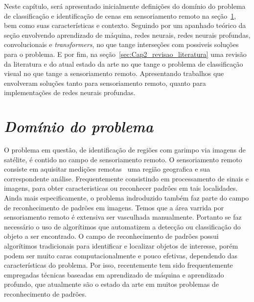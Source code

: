 Neste capítulo, será apresentado inicialmente definições do domínio do problema de classificação e identificação de cenas em sensoriamento remoto na seção~\ref{sec:Cap2_dominio}, bem como suas características e contexto. Seguindo por um apanhado teórico da seção envolvendo aprendizado de máquina, redes neurais, redes neurais profundas, convolucionais e \textit{transformers}, no que tange interseções com possiveis soluções para o problema. E por fim, na seção~\ref{sec:Cap2_revisao_literatura} uma revisão da literatura e do atual estado da arte no que tange o problema de classificação visual no que tange a sensoriamento remoto. Apresentando trabalhos que envolveram soluções tanto para sensoriamento remoto, quanto para implementações de redes neurais profundas.



\section{\textit{Domínio do problema}}\label{sec:Cap2_dominio}



O problema em questão, de identificação de regiões com garimpo via imagens de satélite, é contido no campo de sensoriamento remoto. O sensoriamento remoto consiste em aquisitar medições remotas~\cite{emery2017introduction} uma região geografica e sua correspondente análise. Frequentemente consistindo em processamento de sinais e imagens, para obter caracteristicas ou reconhecer padrões em tais localidades.
Ainda mais especificamente, o problema indroduzido também faz parte do campo de reconhecimento de padrões em imagens. Temos que a área varrida por sensoriamento remoto é extensiva ser vasculhada manualmente. Portanto se faz necessário o uso de algorítimos que automatizem a detecção ou classificação do objeto a ser encontrado.
O campo de reconhecimento de padrões possui algorítimos tradicionais para identificar e localizar objetos de interesse, porém podem ser muito caras computacionalmente e pouco efetivas, dependendo das características do problema. Por isso, recentemente tem sido frequentemente empregadas técnicas baseadas em aprendizado de máquina e aprendizado profundo, que atualmente são o estado da arte em muitos problemas de reconhecimento de padrões.


